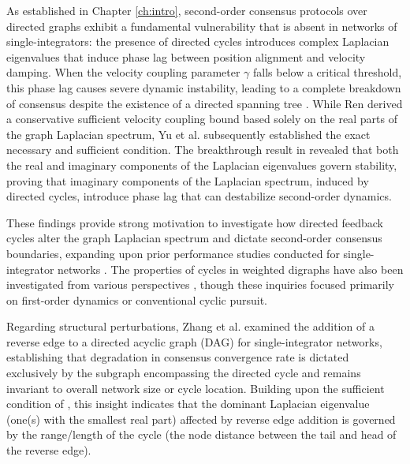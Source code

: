 As established in Chapter \ref{ch:intro}, second-order consensus protocols over directed graphs exhibit a fundamental vulnerability that is absent in networks of single-integrators: the presence of directed cycles introduces complex Laplacian eigenvalues that induce phase lag between position alignment and velocity damping. When the velocity coupling parameter $\gamma$ falls below a critical threshold, this phase lag causes severe dynamic instability, leading to a complete breakdown of consensus despite the existence of a directed spanning tree \cite{ren2005second}. While Ren \cite{ren2008consensus} derived a conservative sufficient velocity coupling bound based solely on the real parts of the graph Laplacian spectrum, Yu et al. \cite{yu2010some} subsequently established the exact necessary and sufficient condition. The breakthrough result in \cite{yu2010some} revealed that both the real and imaginary components of the Laplacian eigenvalues govern stability, proving that imaginary components of the Laplacian spectrum, induced by directed cycles, introduce phase lag that can destabilize second-order dynamics.

These findings provide strong motivation to investigate how directed feedback cycles alter the graph Laplacian spectrum and dictate second-order consensus boundaries, expanding upon prior performance studies conducted for single-integrator networks \cite{zelazo2013performance}. The properties of cycles in weighted digraphs have also been investigated from various perspectives \cite{mukherjee2016consensus, mukherjee2013reachability, mukherjee2021finite}, though these inquiries focused primarily on first-order dynamics or conventional cyclic pursuit.

Regarding structural perturbations, Zhang et al. \cite{zhang2017effect} examined the addition of a reverse edge to a directed acyclic graph (DAG) for single-integrator networks, establishing that degradation in consensus convergence rate is dictated exclusively by the subgraph encompassing the directed cycle and remains invariant to overall network size or cycle location. Building upon the sufficient condition of \cite{ren2008consensus}, this insight indicates that the dominant Laplacian eigenvalue (one(s) with the smallest real part) affected by reverse edge addition is governed by the range/length of the cycle (the node distance between the tail and head of the reverse edge).

